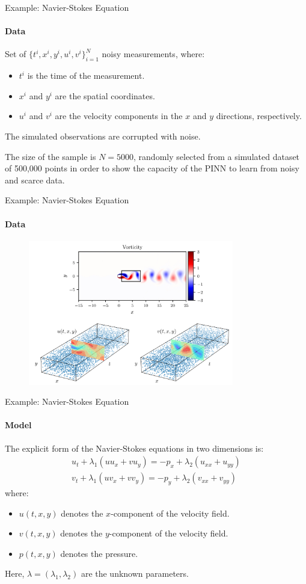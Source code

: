     \begin{frame}{Example: Navier-Stokes Equation}
    \framesubtitle{Data}
    Set of $\{t^i, x^i, y^i, u^i, v^i\}_{i=1}^N$ noisy measurements, where:
    \begin{itemize}
        \item \( t^i \) is the time of the measurement.
        \item \( x^i \) and \( y^i \) are the spatial coordinates.
        \item \( u^i \) and \( v^i \) are the velocity components in the \( x \) and \( y \) directions, respectively.
    \end{itemize}
    
    The simulated observations are corrupted with noise.
    
    The size of the sample is \( N = 5000 \), randomly selected from a simulated dataset of 500,000 points in order to show the capacity of the PINN to learn from noisy and scarce data.
    \end{frame}
    
    \begin{frame}{Example: Navier-Stokes Equation}
    \framesubtitle{Data}
    \begin{figure}[H]
        \centering
        \includegraphics[width=0.8\textwidth]{img/navier-data.png}
    \end{figure}
    \end{frame}
    
    \begin{frame}{Example: Navier-Stokes Equation}
    \framesubtitle{Model}
    The explicit form of the Navier-Stokes equations in two dimensions is:
    \begin{align}
        u_t + \lambda_1(uu_x + vu_y) = -p_x + \lambda_2(u_{xx} + u_{yy})\\
        v_t + \lambda_1(uv_x + vv_y) = -p_y + \lambda_2(v_{xx} + v_{yy})
    \end{align}
    where:
    \begin{itemize}
        \item \( u(t, x, y) \) denotes the \( x \)-component of the velocity field.
        \item \( v(t, x, y) \) denotes the \( y \)-component of the velocity field.
        \item \( p(t, x, y) \) denotes the pressure.
    \end{itemize}
    Here, \( \lambda = (\lambda_1, \lambda_2) \) are the unknown parameters.
    \end{frame}
    
